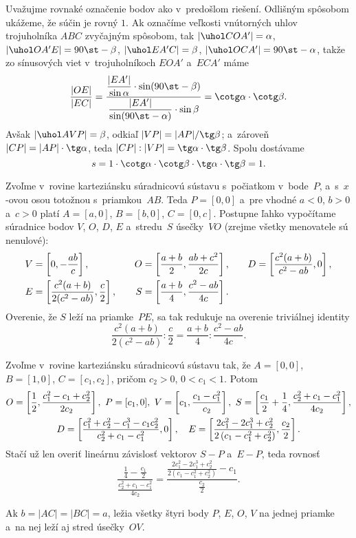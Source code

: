 {\ifrozsirenevzoraky
\ineriesenie
Uvažujme rovnaké označenie bodov ako v~predošlom riešení. Odlišným spôsobom ukážeme, že súčin  je rovný $1$. Ak označíme veľkosti vnútorných uhlov trojuholníka $ABC$ zvyčajným spôsobom, tak $|\uhol COA'|=\alpha$, $|\uhol OA'E|=90\st-\beta$, $|\uhol EA'C|=\beta$, $|\uhol OCA'|=90\st-\alpha$, takže zo sínusových viet v~trojuholníkoch $EOA'$ a~$ECA'$ máme
$$
\frac{|OE|}{|EC|}=\frac{\displaystyle\frac{|EA'|}{\sin\alpha}\cdot\sin(90\st-\beta)}{\displaystyle\frac{|EA'|}{\sin(90\st-\alpha)}\cdot\sin\beta}=
\cotg\alpha\cdot\cotg\beta.
$$
Avšak $|\uhol AVP|=\beta$, odkiaľ $|VP|=|AP|/\tg\beta$; a~zároveň $|CP|=|AP|\cdot\tg\alpha$, teda $|CP|:|VP|=\tg\alpha\cdot\tg\beta$. Spolu dostávame
$$
s=1\cdot\cotg\alpha\cdot\cotg\beta\cdot\tg\alpha\cdot\tg\beta=1.
$$

\fi

\ineriesenie
Zvoľme v~rovine karteziánsku súradnicovú sústavu s~počiatkom v~bode~$P$, a~s~$x$-ovou osou totožnou s~priamkou~$AB$. Teda $P=[0,0]$ a~pre vhodné $a<0$, $b>0$ a~$c>0$ platí $A=[a,0]$, $B=[b,0]$, $C=[0,c]$. Postupne ľahko vypočítame súradnice bodov $V$, $O$, $D$, $E$ a~stredu~$S$ úsečky~$VO$ (zrejme všetky menovatele sú nenulové):
$$
\alignedat3
V&=\left[0,-\frac{ab}c\right],\qquad &
O&=\left[\frac{a+b}2,\frac{ab+c^2}{2c}\right],\qquad &
D&=\left[\frac{c^2(a+b)}{c^2-ab},0\right],\\
E&=\left[\frac{c^2(a+b)}{2(c^2-ab)},\frac c2\right],\qquad &
S&=\left[\frac{a+b}4,\frac{c^2-ab}{4c}\right]. &&
\endalignedat
$$
Overenie, že $S$ leží na priamke~$PE$, sa tak redukuje na overenie triviálnej identity
$$
\frac{c^2(a+b)}{2(c^2-ab)}:\frac c2 = \frac{a+b}4 : \frac{c^2-ab}{4c}.
$$

\ifrozsirenevzoraky
\ineriesenie
Zvoľme v~rovine karteziánsku súradnicovú sústavu tak, že $A=[0,0]$, $B=[1,0]$, $C=[c_1,c_2]$, pričom $c_2>0$, $0<c_1<1$. Potom
$$
\gathered
O=\left[\frac12, \frac {c_1^2-c_1+c_2^2}{2c_2}\right],\
P=[c_1,0], \
V=\left[c_1,\frac{c_1-c_1^2}{c_2}\right], \
S=\left[\frac{c_1}2+\frac14, \frac{c_2^2+c_1-c_1^2}{4c_2}\right],\\
D=\left[\frac{c_1^2+c_2^2-c_1^3-c_1c_2^2}{c_2^2+c_1-c_1^2},0\right], \quad
E=\left[\frac{2c_1^2-2c_1^3+c_2^2}{2\left(c_1-c_1^2+c_2^2\right)}, \frac{c_2}2\right].
\endgathered
$$
Stačí už len overiť lineárnu závislosť vektorov $S-P$ a~$E-P$, teda rovnosť
$$
\frac{\frac14-\frac{c_1}2}{\frac{c_2^2+c_1-c_1^2}{4c_2}}=
\frac{\frac{2c_1^2-2c_1^3+c_2^2}{2\left(c_1-c_1^2+c_2^2\right)}-c_1}{\frac{c_2}2}.
$$

\ineriesenie
Ak $b=|AC|=|BC|=a$, ležia všetky štyri body $P$, $E$, $O$, $V$ na jednej priamke a~na nej leží aj stred úsečky~$OV$.

}
